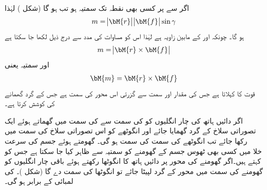 اگر  سے  پر کسی بھی نقطہ  تک سمتیہ  ہو تب  ہو گا (شکل ) لہٰذا 
\begin{align*}
m=\abs{\bM{r}}\abs{\bM{f}}\sin \gamma
\end{align*}
ہو گا۔ چونکہ  اور  کے مابین زاویہ  ہے لہٰذا اس کو مساوات  کی مدد سے  درج ذیل لکھا جا سکتا ہے
\begin{align*}
m=\abs{\bM{r}\times \bM{f}}
\end{align*}
اور سمتیہ  یعنی
\begin{align}
\bM{m}=\bM{r}\times \bM{f}
\end{align}
قوت  کا  کہلاتا ہے جس کی مقدار    اور  سمت  سے گزرتی اس محور کی سمت ہے جس کے گرد    گھمانے کی کوشش کرتا ہے۔

اگر دائیں ہاتھ کی چار انگلیوں کو  کی سمت سے  کی سمت میں گھماتے ہوئے ایک  تصوراتی سلاخ کے گرد  گھمایا جائے اور انگوٹھے  کو اس تصوراتی سلاخ کی سمت میں رکھا جائے تب انگوٹھے کی سمت  کی سمت ہو گی۔ 
\quad گھومتے ہوئے جسم کی  سرعت\\
خلا میں کسی بھی ٹھوس جسم  کے گھومنے کو سمتیہ  سے ظاہر کیا جا سکتا ہے جس کو  کہتے ہیں۔اگر گھومنے کی محور پر دائیں ہاتھ کا انگوٹھا رکھتے ہوئے باقی چار انگلیوں کو گھومنے  کی سمت میں محور کے گرد لپیٹا جائے تو انگوٹھا  کی سمت دے گا  (شکل )۔ کی لمبائی   کے برابر ہو گی۔

